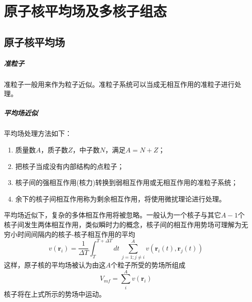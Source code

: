 \chapter{原子核平均场及多核子组态}

\section{原子核平均场}

\paragraph*{准粒子} 准粒子一般用来作为粒子近似。准粒子系统可以当成无相互作用的准粒子进行处理。

\paragraph*{平均场近似} 
平均场处理方法如下：
\begin{enumerate}
	\item 质量数$A$，质子数$Z$，中子数$N$，满足$A=N+Z$；
	\item 把核子当成没有内部结构的点粒子；
	\item 核子间的强相互作用(核力)转换到弱相互作用或无相互作用的准粒子系统；
	\item 余下的核子间相互作用称为剩余相互作用，将使用微扰理论进行处理。
\end{enumerate}

平均场近似下，复杂的多体相互作用将被忽略。一般认为一个核子与其它$A-1$个核子间发生两体相互作用，类似瞬时力的概念，核子间的相互作用势场可理解为无穷小时间间隔内的核子-核子相互作用的平均
\begin{equation}
	v(\bm{r}_i) = \frac{1}{\Delta T} \int_{T}^{T + \Delta T} dt\, \sum_{j = 1; j \neq i}^{A} v(\bm{r}_i(t), \bm{r}_j(t))
\end{equation}
这样，原子核的平均场被认为由这$A$个粒子所受的势场所组成
\begin{equation}
	V_{mf} = \sum_{i}^{A} v(\bm{r}_i)
\end{equation}
核子将在上式所示的势场中运动。

